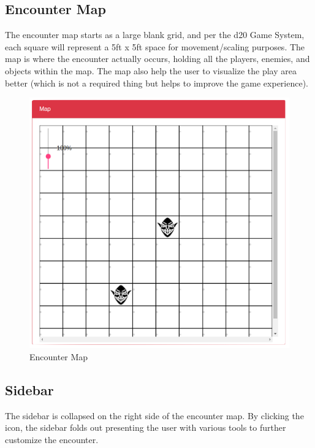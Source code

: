 \documentclass[12pt,a4paper]{report}
\begin{document}
		\subsection{Encounter Map}
		The encounter map starts as a large blank grid, and per the d20 Game System, each square will represent a 5ft x 5ft space for movement/scaling purposes. The map is where the encounter actually occurs, holding all the players, enemies, and objects within the map. The map also help the user to visualize the play area better (which is not a required thing but helps to improve the game experience).
		\begin{figure}[H]
			\centering
			\includegraphics[scale=.5]{encountermap}
			\caption{Encounter Map}
			\label{fig: Encounter Map}
		\end{figure}
		\newpage
		\subsection{Sidebar}
		The sidebar is collapsed on the right side of the encounter map. By clicking the icon, the sidebar folds out presenting the user with various tools to further customize the encounter.
\end{document}
